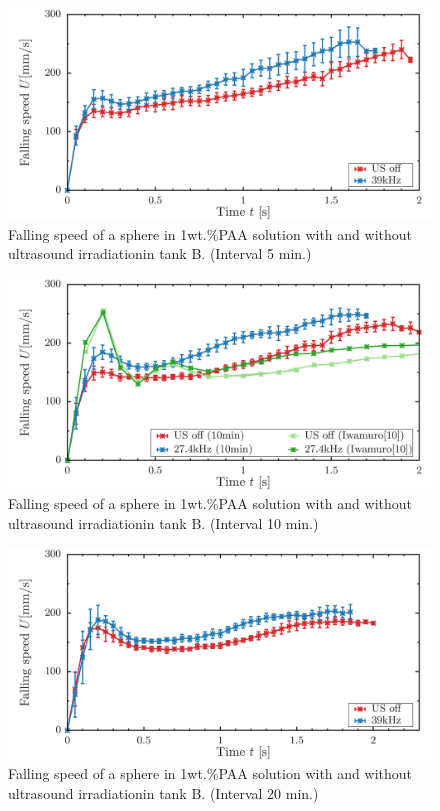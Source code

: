 \begin{figure}[ht]
    \centering
    \includegraphics[width=14cm,clip]{./5-Results/s1-5.png}
    \caption{Falling speed of a sphere in 1wt.\%PAA solution with and without ultrasound irradiationin tank B. (Interval 5 min.)}
    \label{fig:falling-5}
\end{figure}
\begin{figure}[ht]
    \centering
    \includegraphics[width=14cm,clip]{./5-Results/s1-10.png}
    \caption{Falling speed of a sphere in 1wt.\%PAA solution with and without ultrasound irradiationin tank B. (Interval 10 min.)}
    \label{fig:falling-10}
\end{figure}
\begin{figure}[ht]
    \centering
    \includegraphics[width=14cm,clip]{./5-Results/s1-20.png}
    \caption{Falling speed of a sphere in 1wt.\%PAA solution with and without ultrasound irradiationin tank B. (Interval 20 min.)}
    \label{fig:falling-20}
\end{figure}

